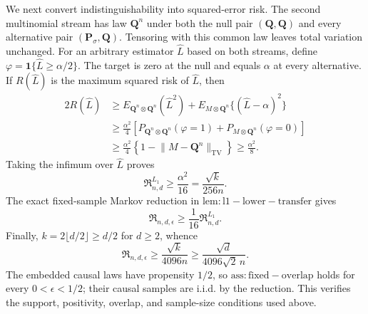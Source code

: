 We next convert indistinguishability into squared-error risk.  The second multinomial stream has law \(\mathbf Q^n\) under both the null pair \((\mathbf Q,\mathbf Q)\) and every alternative pair \((\mathbf P_\sigma,\mathbf Q)\).  Tensoring with this common law leaves total variation unchanged.  For an arbitrary estimator \(\widehat L\) based on both streams, define \(\varphi=\mathbf 1\{\widehat L\ge\alpha/2\}\).  The target is zero at the null and equals \(\alpha\) at every alternative.  If \(R(\widehat L)\) is the maximum squared risk of \(\widehat L\), then
\[
 \begin{aligned}
 2R(\widehat L)
 &\ge E_{\mathbf Q^n\otimes\mathbf Q^n}(\widehat L^2)
   +E_{M\otimes\mathbf Q^n}\{(\widehat L-\alpha)^2\}\\
 &\ge\frac{\alpha^2}{4}
 \left[
  P_{\mathbf Q^n\otimes\mathbf Q^n}(\varphi=1)
  +P_{M\otimes\mathbf Q^n}(\varphi=0)
 \right]\\
 &\ge\frac{\alpha^2}{4}
 \left\{1-\lVert M-\mathbf Q^n\rVert_{\mathrm{TV}}\right\}
 \ge\frac{\alpha^2}{8}.
 \end{aligned}
\]
Taking the infimum over \(\widehat L\) proves
\[
 \mathfrak R^{L_1}_{n,d}\ge\frac{\alpha^2}{16}
 =\frac{\sqrt{k}}{256n}.
\]
The exact fixed-sample Markov reduction in \(\mathrm{lem:l1-lower-transfer}\) gives
\[
 \mathfrak R_{n,d,\epsilon}
 \ge\frac1{16}\mathfrak R^{L_1}_{n,d}.
\]
Finally, \(k=2\lfloor d/2\rfloor\ge d/2\) for \(d\ge2\), whence
\[
 \mathfrak R_{n,d,\epsilon}
 \ge\frac{\sqrt{k}}{4096n}
 \ge\frac{\sqrt d}{4096\sqrt2\,n}.
\]
The embedded causal laws have propensity \(1/2\), so \(\mathrm{ass:fixed-overlap}\) holds for every \(0<\epsilon<1/2\); their causal samples are i.i.d. by the reduction.  This verifies the support, positivity, overlap, and sample-size conditions used above.